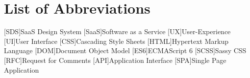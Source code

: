 \section*{List of Abbreviations}
\begin{acronym}
    [SDS]{SaaS Design System}
    [SaaS]{Software as a Service}
    [UX]{User-Experience}
    [UI]{User Interface}
    [CSS]{Cascading Style Sheets}
    [HTML]{Hypertext Markup Language}
    [DOM]{Document Object Model}
    [ES6]{ECMAScript 6}
    [SCSS]{Sassy CSS}
    [RFC]{Request for Comments}
    [API]{Application Interface}
    [SPA]{Single Page Application}

\end{acronym}